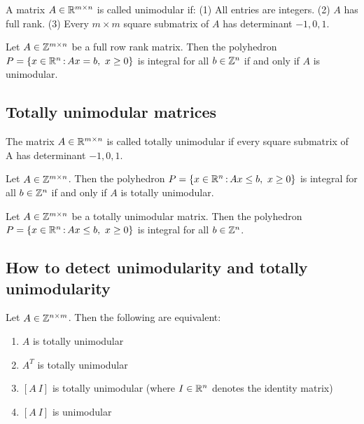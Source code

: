\documentclass[../open-optimization/open-optimization.tex]{subfiles}
\begin{document}
\begin{definition}
A matrix $A\in{\mathbb{R}}^{m\times n}$ is called unimodular if: (1) All entries are integers.
	(2) $A$ has full rank. (3) Every $m\times m$ square submatrix of $A$ has determinant $-1,0,1$.
\end{definition}

\begin{theorem} Let $A\in{\mathbb{Z}}^{m\times n}$ be a full row rank matrix. Then the polyhedron $P=\{x\in{\mathbb{R}}^n{\,:\,} Ax=b,\ x\geq 0\}$ is integral for all $b\in{\mathbb{Z}}^n$ if and only if $A$ is unimodular.
\end{theorem}



\subsection{Totally unimodular matrices}
\begin{definition}
The matrix $A\in{\mathbb{R}}^{m\times n}$ is called totally unimodular if every square submatrix
of A has determinant $-1,0,1$.
\end{definition}

\begin{theorem} Let $A\in{\mathbb{Z}}^{m\times n}$. Then the polyhedron $P=\{x\in{\mathbb{R}}^n{\,:\,} Ax\leq b,\ x\geq 0\}$ is integral for all $b\in{\mathbb{Z}}^n$ if and only if $A$ is totally unimodular.
\end{theorem}

\begin{theorem} Let $A\in{\mathbb{Z}}^{m\times n}$ be a totally unimodular matrix. Then the polyhedron $P=\{x\in{\mathbb{R}}^n{\,:\,} Ax\leq b,\ x\geq 0\}$ is integral for all $b\in{\mathbb{Z}}^n$.
\end{theorem}

\subsection{How to detect unimodularity and totally unimodularity}

\begin{theorem} Let  $A\in{\mathbb{Z}}^{n\times m}$. Then the following are equivalent: 
\begin{enumerate}
	\item $A$ is totally unimodular
	\item $A^T$ is totally unimodular
	\item  $[A\ I]$ is totally unimodular (where $I\in {\mathbb{R}}^n$ denotes the identity matrix)
	\item $[A\ I]$ is unimodular
\end{enumerate}
\end{theorem}
\end{document}
